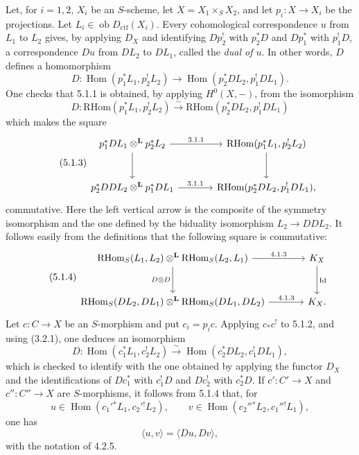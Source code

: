 \documentclass[11pt]{article}
\DeclareMathOperator{\Hom}{Hom}
\providecommand{\RHom}{\mathrm{RHom}}
\providecommand{\RHom}{\mathrm{RHom}}
\providecommand{\Hom}{\operatorname{Hom}}
\providecommand{\RHom}{\mathrm R\mathcal{H}om}
\providecommand{\RHom}{\mathrm{RHom}}
\begin{document}
Let, for $i=1,2$, $X_i$ be an $S$-scheme, let $X=X_1\times_S X_2$, and let $p_i:X\to X_i$ be the projections. Let $L_i\in\operatorname{ob}D_{\mathrm{ctf}}(X_i)$. Every cohomological correspondence $u$ from $L_1$ to $L_2$ gives, by applying $D_X$ and identifying $Dp_2^!$ with $p_2^*D$ and $Dp_1^*$ with $p_1^!D$, a correspondence $Du$ from $DL_2$ to $DL_1$, called the \emph{dual of $u$}. In other words, $D$ defines a homomorphism
\begin{equation}
\tag{5.1.1}
D:\Hom(p_1^*L_1,p_2^!L_2)\longrightarrow \Hom(p_2^*DL_2,p_1^!DL_1).
\end{equation}
One checks that 5.1.1 is obtained, by applying $H^0(X,-)$, from the isomorphism
\begin{equation}
\tag{5.1.2}
D:\RHom(p_1^*L_1,p_2^!L_2)\xrightarrow{\sim}\RHom(p_2^*DL_2,p_1^!DL_1)
\end{equation}
which makes the square
\begin{equation}
\tag{5.1.3}
\begin{tikzcd}[column sep=large,row sep=large]
p_1^*DL_1\otimes^{\mathbf L}p_2^*L_2 \arrow[r,"3.1.1"] \arrow[d]
& \RHom(p_1^*L_1,p_2^!L_2) \arrow[d] \\
p_2^*DDL_2\otimes^{\mathbf L}p_1^*DL_1 \arrow[r,"3.1.1"]
& \RHom(p_2^*DL_2,p_1^!DL_1),
\end{tikzcd}
\end{equation}
commutative. Here the left vertical arrow is the composite of the symmetry isomorphism and the one defined by the biduality isomorphism $L_2\to DDL_2$. It follows easily from the definitions that the following square is commutative:
\begin{equation}
\tag{5.1.4}
\begin{tikzcd}[column sep=large,row sep=large]
\RHom_S(L_1,L_2)\otimes^{\mathbf L}\RHom_S(L_2,L_1) \arrow[r,"4.1.3"] \arrow[d,"D\otimes D"']
& K_X \arrow[d,"\operatorname{Id}"] \\
\RHom_S(DL_2,DL_1)\otimes^{\mathbf L}\RHom_S(DL_1,DL_2) \arrow[r,"4.1.3"]
& K_X.
\end{tikzcd}
\end{equation}
Let $c:C\to X$ be an $S$-morphism and put $c_i=p_ic$. Applying $c_*c^!$ to 5.1.2, and using (3.2.1), one deduces an isomorphism
\begin{equation}
\tag{5.1.5}
D:\Hom(c_1^*L_1,c_2^!L_2)\xrightarrow{\sim}\Hom(c_2^*DL_2,c_1^!DL_1),
\end{equation}
which is checked to identify with the one obtained by applying the functor $D_X$ and the identifications of $Dc_1^*$ with $c_1^!D$ and $Dc_2^!$ with $c_2^*D$. If $c':C'\to X$ and $c'':C''\to X$ are $S$-morphisms, it follows from 5.1.4 that, for
\[
u\in\Hom(c_1'{}^*L_1,c_2'{}^!L_2),\qquad v\in\Hom(c_2''{}^*L_2,c_1''{}^!L_1),\]
one has
\begin{equation}
\tag{5.1.6}
\langle u,v\rangle=\langle Du,Dv\rangle,
\end{equation}
with the notation of 4.2.5.
\end{document}
